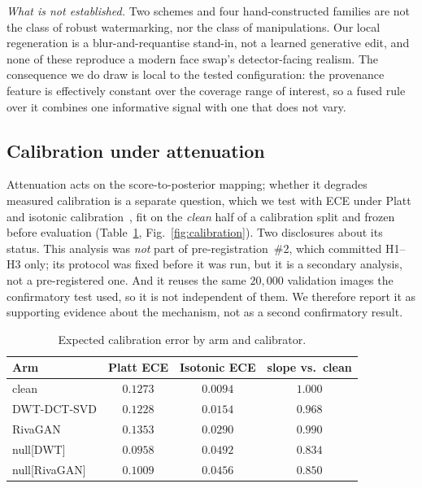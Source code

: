 \documentclass[journal]{IEEEtran}
\begin{document}
\emph{What is not established.} Two schemes and four hand-constructed
families are not the class of robust watermarking, nor the class of
manipulations. Our local regeneration is a blur-and-requantise stand-in, not
a learned generative edit, and none of these reproduce a modern face swap's
detector-facing realism. The consequence we do draw is local to the tested
configuration: the provenance feature is effectively constant over the
coverage range of interest, so a fused rule over it combines one informative
signal with one that does not vary.

\subsection{Calibration under attenuation}
\label{sec:calibration}

Attenuation acts on the score-to-posterior mapping; whether it degrades
measured calibration is a separate question, which we test with ECE under
Platt and isotonic calibration~\cite{guo2017calibration}, fit on the
\emph{clean} half of a calibration split and frozen before evaluation
(Table~\ref{tab:calibration}, Fig.~\ref{fig:calibration}). Two disclosures
about its status. This analysis was \emph{not} part of pre-registration~\#2,
which committed H1--H3 only; its protocol was fixed before it was run, but it
is a secondary analysis, not a pre-registered one. And it reuses the same
$20{,}000$ validation images the confirmatory test used, so it is not
independent of them. We therefore report it as supporting evidence about the
mechanism, not as a second confirmatory result.

\begin{table}[t]
\centering
\caption{Expected calibration error by arm and calibrator.}
\label{tab:calibration}
\footnotesize
\begin{tabular}{lccc}
\toprule
Arm & Platt ECE & Isotonic ECE & slope vs.\ clean \\
\midrule
clean            & $0.1273$ & $\mathbf{0.0094}$ & $1.000$ \\
DWT-DCT-SVD      & $0.1228$ & $0.0154$ & $0.968$ \\
RivaGAN          & $0.1353$ & $0.0290$ & $0.990$ \\
null[DWT]        & $0.0958$ & $\mathbf{0.0492}$ & $0.834$ \\
null[RivaGAN]    & $0.1009$ & $\mathbf{0.0456}$ & $0.850$ \\
\bottomrule
\end{tabular}
\end{table}
\end{document}
